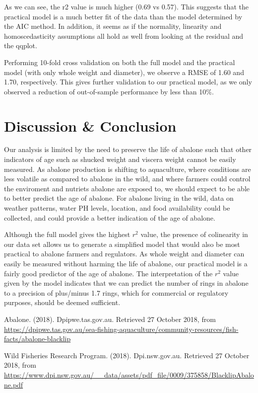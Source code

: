 \documentclass[10pt,twocolumn]{article}
\begin{document}
		As we can see, the r2 value is much higher (0.69 vs 0.57). This suggests that the practical model is a much better fit of the data than the model determined by the AIC method. In addition, it seems as if the normality, linearity and homoscedasticity assumptions all hold as well from looking at the residual and the qqplot.
		
		Performing 10-fold cross validation on both the full model and the practical model (with only whole weight and diameter), we observe a RMSE of 1.60 and 1.70, respectively. This gives further validation to our practical model, as we only observed a reduction of out-of-sample performance by less than 10\%. 
	
	\section{Discussion \& Conclusion}
	
		Our analysis is limited by the need to preserve the life of abalone such that other indicators of age such as shucked weight and viscera weight cannot be easily measured. As abalone production is shifting to aquaculture, where conditions are less volatile as compared to abalone in the wild, and where farmers could control the enviroment and nutriets abalone are exposed to, we should expect to be able to better predict the age of abalone. For abalone living in the wild, data on weather patterns, water PH levels, location, and food availability could be collected, and could provide a better indication of the age of abalone.
		
		Although the full model gives the highest $r^2$ value, the presence of colinearity in our data set allows us to generate a simplified model that would also be most practical to abalone farmers and regulators. As whole weight and diameter can easily be measured without harming the life of abalone, our practical model is a fairly good predictor of the age of abalone. The interpretation of the $r^2$ value given by the model indicates that we can predict the number of rings in abalone to a precision of plus/minus 1.7 rings, which for commercial or regulatory purposes, should be deemed sufficient.
		
	
	\begin{thebibliography}{9}
		Abalone. (2018). Dpipwe.tas.gov.au. Retrieved 27 October 2018, from \url{https://dpipwe.tas.gov.au/sea-fishing-aquaculture/community-resources/fish-facts/abalone-blacklip}
		
		Wild Fisheries Research Program. (2018). Dpi.nsw.gov.au. Retrieved 27 October 2018, from		\url{https://www.dpi.nsw.gov.au/__data/assets/pdf_file/0009/375858/BlacklipAbalone.pdf}
	\end{thebibliography}
\end{document}
